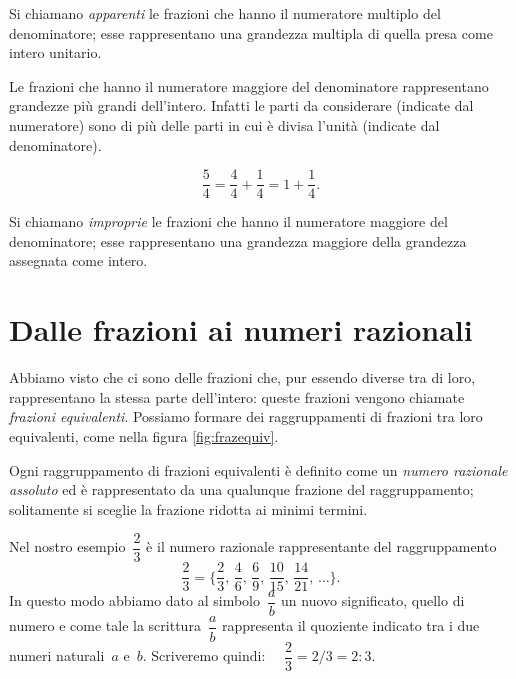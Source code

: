 \begin{definizione}
 Si chiamano \emph{apparenti} le frazioni che hanno il numeratore multiplo del denominatore;
esse rappresentano una grandezza multipla di quella presa come intero unitario.
\end{definizione}

Le frazioni che hanno il numeratore maggiore del denominatore rappresentano grandezze più grandi dell'intero.
Infatti le parti da considerare (indicate dal numeratore) sono di più delle parti in cui è divisa l'unità
(indicate dal denominatore).
\begin{center}
 
\end{center}
\[\frac{5}{4}=\frac{4}{4}+\frac{1}{4}=1+\frac{1}{4}.\]

\begin{definizione}
 Si chiamano \emph{improprie} le frazioni che hanno il numeratore maggiore del denominatore;
esse rappresentano una grandezza maggiore della grandezza assegnata come intero.
\end{definizione}

\ovalbox{\risolvii \ref{ese:3.5}, \ref{ese:3.6}, \ref{ese:3.7}, \ref{ese:3.8}, \ref{ese:3.9}, \ref{ese:3.10}, \ref{ese:3.11},
\ref{ese:3.12}, \ref{ese:3.13}, \ref{ese:3.14}, \ref{ese:3.15}, \ref{ese:3.16}, \ref{ese:3.17},}

\vspazio\ovalbox{\ref{ese:3.18}, \ref{ese:3.19}, \ref{ese:3.20}, \ref{ese:3.21}}

\section{Dalle frazioni ai numeri razionali}

Abbiamo visto che ci sono delle frazioni che, pur essendo diverse tra di loro, rappresentano la stessa
parte dell'intero: queste frazioni vengono chiamate \emph{frazioni equivalenti}.
Possiamo formare dei raggruppamenti di frazioni tra loro equivalenti, come nella figura \ref{fig:frazequiv}.

\begin{definizione}
Ogni raggruppamento di frazioni equivalenti è definito come un \emph{numero razionale assoluto}
ed è rappresentato da una qualunque
frazione del raggruppamento; solitamente si sceglie la frazione ridotta ai minimi termini.
\end{definizione}

Nel nostro esempio~$\dfrac{2}{3}$ è il numero razionale rappresentante del raggruppamento
\[\frac{2}{3}=\bigg\lbrace\frac{2}{3}\text{,~}\frac{4}{6}\text{,~}\frac{6}{9}\text{,~}\frac{10}{15}\text{,~}\frac{14}{21}\text{,~}\ldots\bigg\rbrace.\]
In questo modo abbiamo dato al simbolo~$\dfrac{a}{b}$ un nuovo significato, quello di numero e come tale la
scrittura~$\dfrac{a}{b}$ rappresenta il quoziente indicato tra i due numeri naturali~$a$ e~$b$. Scriveremo quindi:~~
$ \dfrac{2}{3} = 2/3 = 2:3 $.

